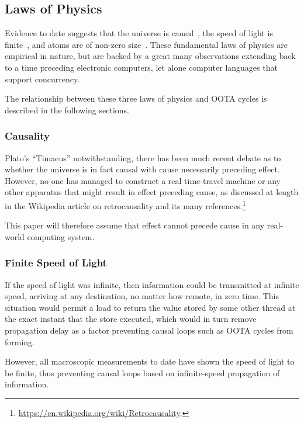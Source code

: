 \documentclass[10]{article}
\begin{document}
\subsection{Laws of Physics}
\label{sec:Laws of Physics}

Evidence to date suggests that the universe is
causal~\cite{Plato360BC-causality},
the speed of light is finite~\cite{OleRoemer1671SpeedOfLight}, and
atoms are of non-zero size~\cite{JeanBaptistePerrin1923AtomSize}.
These fundamental laws of physics are empirical in nature, but
are backed by a great many observations extending back to a time
preceding electronic computers, let alone computer languages that
support concurrency.

The relationship between these three laws of physics and OOTA
cycles is described in the following sections.

\subsubsection{Causality}
\label{sec:Causality}

Plato's ``Timaeus'' notwithstanding, there has been much recent debate
as to whether the universe is in fact causal with cause necessarily
preceding effect.
However, no one has managed to construct a real time-travel machine
or any other apparatus that might result in effect preceding cause,
as discussed at length in the Wikipedia article on retrocausality and
its many references.\footnote{
	\url{https://en.wikipedia.org/wiki/Retrocausality}.}

This paper will therefore assume that effect cannot precede cause in
any real-world computing system.

\subsubsection{Finite Speed of Light}
\label{sec:Finite Speed of Light}

If the speed of light was infinite, then information could be transmitted
at infinite speed, arriving at any destination, no matter how remote,
in zero time.
This situation would permit a load to return the value stored by some
other thread at the exact instant that the store executed, which
would in turn remove propagation delay as a factor preventing
causal loops such as OOTA cycles from forming.

However, all macroscopic measurements to date have shown the speed of
light to be finite, thus preventing causal loops based on infinite-speed
propagation of information.
\end{document}
